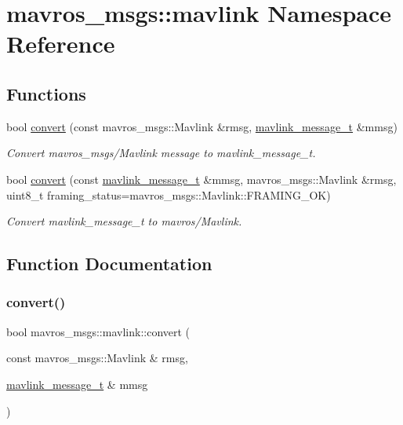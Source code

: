 \hypertarget{namespacemavros__msgs_1_1mavlink}{}\section{mavros\+\_\+msgs\+::mavlink Namespace Reference}
\label{namespacemavros__msgs_1_1mavlink}
\subsection*{Functions}
\begin{DoxyCompactItemize}
\item 
bool \mbox{\hyperlink{namespacemavros__msgs_1_1mavlink_ad83510319eb707cba00260e62ece77f5}{convert}} (const mavros\+\_\+msgs\+::\+Mavlink \&rmsg, \mbox{\hyperlink{include__v0_89_2mavlink__types_8h_a63b963764c09dc72f4910c1521e325b9}{mavlink\+\_\+message\+\_\+t}} \&mmsg)
\begin{DoxyCompactList}\small\item\em Convert mavros\+\_\+msgs/\+Mavlink message to mavlink\+\_\+message\+\_\+t. \end{DoxyCompactList}\item 
bool \mbox{\hyperlink{namespacemavros__msgs_1_1mavlink_ad5a4915ea26c60f70503efe0a344ee35}{convert}} (const \mbox{\hyperlink{include__v0_89_2mavlink__types_8h_a63b963764c09dc72f4910c1521e325b9}{mavlink\+\_\+message\+\_\+t}} \&mmsg, mavros\+\_\+msgs\+::\+Mavlink \&rmsg, uint8\+\_\+t framing\+\_\+status=mavros\+\_\+msgs\+::\+Mavlink\+::\+F\+R\+A\+M\+I\+N\+G\+\_\+\+OK)
\begin{DoxyCompactList}\small\item\em Convert mavlink\+\_\+message\+\_\+t to mavros/\+Mavlink. \end{DoxyCompactList}\end{DoxyCompactItemize}


\subsection{Function Documentation}
\mbox{\label{namespacemavros__msgs_1_1mavlink_ad83510319eb707cba00260e62ece77f5}} 
\subsubsection{\texorpdfstring{convert()}{convert()}\hspace{0.1cm}{\footnotesize\ttfamily [1/2]}}
{\footnotesize\ttfamily bool mavros\+\_\+msgs\+::mavlink\+::convert (\begin{DoxyParamCaption}\item[{const mavros\+\_\+msgs\+::\+Mavlink \&}]{rmsg,  }\item[{\mbox{\hyperlink{include__v0_89_2mavlink__types_8h_a63b963764c09dc72f4910c1521e325b9}{mavlink\+\_\+message\+\_\+t}} \&}]{mmsg }\end{DoxyParamCaption})\hspace{0.3cm}{\ttfamily [inline]}}



